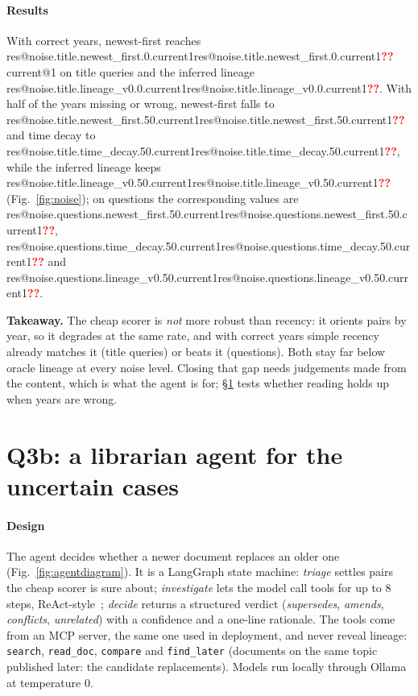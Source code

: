 \documentclass[11pt,a4paper]{article}
\makeatletter
\newcommand{\res}[1]{\ifcsname res@#1\endcsname\csname res@#1\endcsname\else\textcolor{red}{\textbf{??}}\fi}
\newcommand{\code}[1]{\texttt{\small #1}}
\newcommand{\status}[2]{%
  \par\vspace{-0.3em}{\sffamily\footnotesize
  \tcbox[on line,colback=#1!12,colframe=#1!12,boxrule=0pt,arc=6pt,
    left=4pt,right=4pt,top=1pt,bottom=1pt]{\textcolor{#1!70!black}{\textbf{#2}}}}\par\vspace{0.2em}}
\newcommand{\prelim}[1][preliminary]{\status{orange}{#1}}
\newcommand{\Takeaway}[1]{\begin{takeaway}\textsf{\textbf{\color{accent}Takeaway.}} #1\end{takeaway}}
\makeatother
\begin{document}
\paragraph{Results} With correct years, newest-first reaches
\res{noise.title.newest_first.0.current1} current@1 on title queries and the
inferred lineage \res{noise.title.lineage_v0.0.current1}. With half of the years
missing or wrong, newest-first falls to \res{noise.title.newest_first.50.current1}
and time decay to \res{noise.title.time_decay.50.current1}, while the inferred
lineage keeps \res{noise.title.lineage_v0.50.current1}
(Fig.~\ref{fig:noise}); on questions the corresponding values are
\res{noise.questions.newest_first.50.current1},
\res{noise.questions.time_decay.50.current1} and
\res{noise.questions.lineage_v0.50.current1}.

\Takeaway{The cheap scorer is \emph{not} more robust than recency: it orients pairs by
year, so it degrades at the same rate, and with correct years simple recency
already matches it (title queries) or beats it (questions). Both stay far below
oracle lineage at every noise level. Closing that gap needs judgements made from
the content, which is what the agent is for; §\ref{sec:agent} tests whether reading
holds up when years are wrong.}

\section{Q3b: a librarian agent for the uncertain cases}\label{sec:agent}
\prelim[100 pairs · one corruption seed]

\paragraph{Design} The agent decides whether a newer document replaces an older
one (Fig.~\ref{fig:agentdiagram}). It is a LangGraph state machine: \emph{triage}
settles pairs the cheap scorer is sure about; \emph{investigate} lets the model call
tools for up to 8 steps, ReAct-style~\cite{yao2023react}; \emph{decide} returns a
structured verdict (\emph{supersedes}, \emph{amends}, \emph{conflicts},
\emph{unrelated}) with a confidence and a one-line rationale. The tools come from
an MCP server, the same one used in deployment, and never reveal lineage:
\code{search}, \code{read\_doc}, \code{compare} and \code{find\_later} (documents on
the same topic published later: the candidate replacements). Models run locally
through Ollama at temperature 0.
\end{document}
